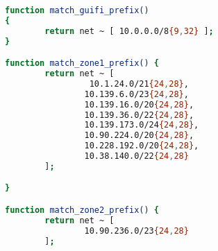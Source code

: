 \begin{lstlisting}[language=bash, caption={Bird Functions}]
function match_guifi_prefix()
{
        return net ~ [ 10.0.0.0/8{9,32} ];
}

function match_zone1_prefix() {
        return net ~ [
                 10.1.24.0/21{24,28},
                10.139.6.0/23{24,28},
                10.139.16.0/20{24,28},
                10.139.36.0/22{24,28},
                10.139.173.0/24{24,28},
                10.90.224.0/20{24,28},
                10.228.192.0/20{24,28},
                10.38.140.0/22{24,28}
        ];

}

function match_zone2_prefix() {
        return net ~ [
                10.90.236.0/23{24,28}
        ];
\end{lstlisting}